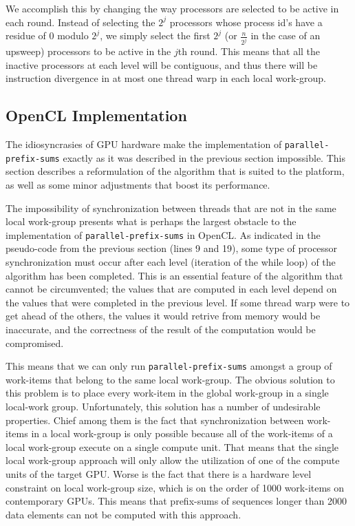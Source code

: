 \documentclass[12pt,twoside]{reedthesis}
\newcommand{\procedure}[1]{{\tt#1}}
\begin{document}
We accomplish this by changing the way processors are selected to be active in each round. Instead of selecting the $2^j$ processors whose process id's have a residue of 0 modulo $2^j$, we simply select the first $2^j$ (or $\frac{n}{2^j}$ in the case of an upsweep) processors to be active in the $j$th round. This means that all the inactive processors at each level will be contiguous, and thus there will be instruction divergence in at most one thread warp in each local work-group.

\subsection{OpenCL Implementation}
\label{sec:opclpsums}

The idiosyncrasies of GPU hardware make the implementation of \procedure{parallel-prefix-sums} exactly as it was described in the previous section impossible. This section describes a reformulation of the algorithm that is suited to the platform, as well as some minor adjustments that boost its performance.

The impossibility of synchronization between threads that are not in the same local work-group presents what is perhaps the largest obstacle to the implementation of \procedure{parallel-prefix-sums} in OpenCL. As indicated in the pseudo-code from the previous section (lines 9 and 19), some type of processor synchronization must occur after each level (iteration of the while loop) of the algorithm has been completed. This is an essential feature of the algorithm that cannot be circumvented; the values that are computed in each level depend on the values that were completed in the previous level. If some thread warp were to get ahead of the others, the values it would retrive from memory would be inaccurate, and the correctness of the result of the computation would be compromised.

This means that we can only run \procedure{parallel-prefix-sums} amongst a group of work-items that belong to the same local work-group. The obvious solution to this problem is to place every work-item in the global work-group in a single local-work group. Unfortunately, this solution has a number of undesirable properties. Chief among them is the fact that synchronization between work-items in a local work-group is only possible because all of the work-items of a local work-group execute on a single compute unit. That means that the single local work-group approach will only allow the utilization of one of the compute units of the target GPU. Worse is the fact that there is a hardware level constraint on local work-group size, which is on the order of 1000 work-items on contemporary GPUs. This means that prefix-sums of sequences longer than 2000 data elements can not be computed with this approach.
\end{document}
